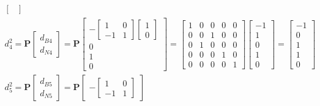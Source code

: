\documentclass[11pt]{article}
\begin{document}
\begin{enumerate}
\begin{align*}
\begin{bmatrix}
      \end{bmatrix}
      \\
      d_4^2 = \textbf{P}
      \begin{bmatrix}
         d_{B4} \\ d_{N4}
      \end{bmatrix}
      =
      \textbf{P}
      \begin{bmatrix}
        -
        \begin{bmatrix}
         1 & 0 \\ -1 & 1   
        \end{bmatrix}
        \begin{bmatrix}
            1 \\ 0
        \end{bmatrix} \\
        0 \\ 1 \\ 0
      \end{bmatrix}
      = 
      \begin{bmatrix}
        1 & 0 & 0 & 0 & 0 \\
        0 & 0 & 1 & 0 & 0 \\
        0 & 1 & 0 & 0 & 0 \\
        0 & 0 & 0 & 1 & 0 \\
        0 & 0 & 0 & 0 & 1
      \end{bmatrix}
      \begin{bmatrix}
        -1 \\ 1 \\ 0 \\ 1 \\ 0 
      \end{bmatrix}
      =
      \begin{bmatrix}
        -1 \\ 0 \\ 1 \\ 1 \\ 0 
      \end{bmatrix}
      \\
      d_5^2 = \textbf{P}
      \begin{bmatrix}
         d_{B5} \\ d_{N5}
      \end{bmatrix}
      =
      \textbf{P}
      \begin{bmatrix}
        -
        \begin{bmatrix}
         1 & 0 \\ -1 & 1   
        \end{bmatrix}

\end{bmatrix}
\end{align*}
\end{enumerate}
\end{document}
